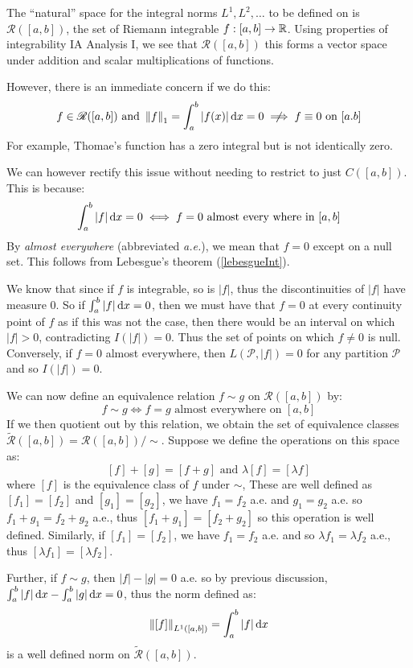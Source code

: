 \documentclass[../main.tex]{subfiles}
\begin{document}
\begin{remark}[Aside] \label{RIntAside}
  \nonexaminable
  The ``natural'' space for the integral norms $L^1, L^2, \ldots$ to be defined on is $\mathscr{R}([a, b])$, the set of Riemann integrable $f: [a, b] \to \mathbb{R}$.
  Using properties of integrability IA Analysis I, we see that $\mathscr{R}([a, b])$ this forms a vector space under addition and scalar multiplications of functions.

  However, there is an immediate concern if we do this:
  \[
    f \in \mathscr{R}([a, b]) \text{ and } \norm{f}_1 = \int_{a}^{b} |f(x)| \d{x} = 0 \centernot\implies f \equiv 0 \text{ on } [a. b]
  \]
  For example, Thomae's function has a zero integral but is not identically zero.

  We can however rectify this issue without needing to restrict to just $C([a, b])$.
  This is because:
  \[
    \int_{a}^{b} |f| \d{x} = 0 \iff f = 0 \text{ almost every where in $[a, b]$}
  \]
  By \textit{almost everywhere} (abbreviated \textit{a.e.}), we mean that $f = 0$ except on a null set.
  This follows from Lebesgue's theorem (\cref{lebesgueInt}).

  We know that since if $f$ is integrable, so is $|f|$, thus the discontinuities of $|f|$ have measure 0.
  So if $\int_{a}^{b} |f| \d{x} = 0$, then we must have that $f = 0$ at every continuity point of $f$ as if this was not the case, then there would be an interval on which $|f| > 0$, contradicting $I(|f|) = 0$.
  Thus the set of points on which $f \neq 0$ is null.
  Conversely, if $f = 0$ almost everywhere, then $L(\mathcal{P}, |f|) = 0$ for any partition $\mathcal{P}$ and so $I(|f|) = 0$.

  We can now define an equivalence relation $f \sim g$ on $\mathscr{R}([a, b])$ by:
  \[
    f \sim g \iff f = g \text{ almost everywhere on } [a, b]
  \]
  If we then quotient out by this relation, we obtain the set of equivalence classes $\widetilde{\mathscr{R}}([a, b]) = \mathscr{R}([a, b]) / \sim$.
  Suppose we define the operations on this space as:
  \[
    [f] + [g] = [f + g] \text{ and } \lambda [f] = [\lambda f]
  \]
  where $[f]$ is the equivalence class of $f$ under $\sim$,
  These are well defined as $[f_1] = [f_2]$ and $[g_1] = [g_2]$, we have $f_1 = f_2$ a.e. and $g_1 = g_2$ a.e. so $f_1 + g_1 = f_2 + g_2$ a.e., thus $[f_1 + g_1] = [f_2 + g_2]$ so this operation is well defined.
  Similarly, if $[f_1] = [f_2]$, we have $f_1 = f_2$ a.e. and so $\lambda f_1 = \lambda f_2$ a.e., thus $[\lambda f_1] = [\lambda f_2]$.

  Further, if $f \sim g$, then $|f| - |g| = 0$ a.e. so by previous discussion, $\int_{a}^{b} |f| \d{x} - \int_{a}^{b} |g| \d{x} = 0$, thus the norm defined as:
  \[
    \norm{[f]}_{L^1([a, b])} = \int_{a}^{b} |f| \d{x}
  \]
  is a well defined norm on $\widetilde{\mathscr{R}}([a, b])$.
\end{remark}
\end{document}
